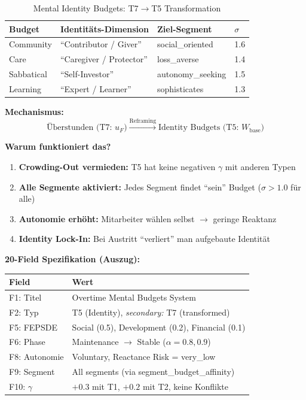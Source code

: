 \begin{table}[htbp]
\centering
\caption{Mental Identity Budgets: T7$\rightarrow$T5 Transformation}
\label{tab:17-mental-budgets}
\renewcommand{\arraystretch}{1.3}
\small
\begin{tabular}{@{}llll@{}}
\toprule
\textbf{Budget} & \textbf{Identitäts-Dimension} & \textbf{Ziel-Segment} & \textbf{$\sigma$} \\
\midrule
Community & ``Contributor / Giver'' & social\_oriented & 1.6 \\
Care & ``Caregiver / Protector'' & loss\_averse & 1.4 \\
Sabbatical & ``Self-Investor'' & autonomy\_seeking & 1.5 \\
Learning & ``Expert / Learner'' & sophisticates & 1.3 \\
\bottomrule
\end{tabular}
\end{table}

\textbf{Mechanismus:}
\begin{equation}
\text{Überstunden (T7: } u_F\text{)} \xrightarrow{\text{Reframing}} \text{Identity Budgets (T5: } W_{\text{base}}\text{)}
\end{equation}

\textbf{Warum funktioniert das?}
\begin{enumerate}[nosep]
\item \textbf{Crowding-Out vermieden:} T5 hat keine negativen $\gamma$ mit anderen Typen
\item \textbf{Alle Segmente aktiviert:} Jedes Segment findet ``sein'' Budget ($\sigma > 1.0$ für alle)
\item \textbf{Autonomie erhöht:} Mitarbeiter wählen selbst $\rightarrow$ geringe Reaktanz
\item \textbf{Identity Lock-In:} Bei Austritt ``verliert'' man aufgebaute Identität
\end{enumerate}

\textbf{20-Field Spezifikation (Auszug):}
\begin{center}
\begin{tabular}{@{}ll@{}}
\toprule
\textbf{Field} & \textbf{Wert} \\
\midrule
F1: Titel & Overtime Mental Budgets System \\
F2: Typ & T5 (Identity), \textit{secondary:} T7 (transformed) \\
F5: FEPSDE & Social (0.5), Development (0.2), Financial (0.1) \\
F6: Phase & Maintenance $\rightarrow$ Stable ($\alpha = 0.8, 0.9$) \\
F8: Autonomie & Voluntary, Reactance Risk = very\_low \\
F9: Segment & All segments (via segment\_budget\_affinity) \\
F10: $\gamma$ & $+0.3$ mit T1, $+0.2$ mit T2, keine Konflikte \\
\bottomrule
\end{tabular}
\end{center}

